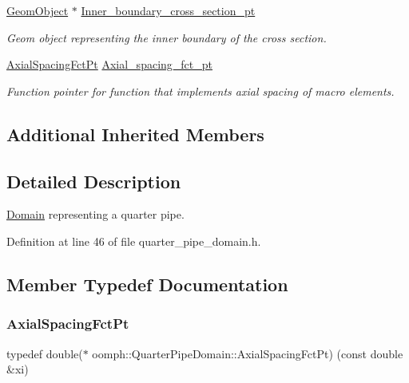 \begin{DoxyCompactItemize}
\hyperlink{classoomph_1_1GeomObject}{Geom\+Object} $\ast$ \hyperlink{classoomph_1_1QuarterPipeDomain_a2760038e136d58a41dcbcd045bd13ae4}{Inner\+\_\+boundary\+\_\+cross\+\_\+section\+\_\+pt}
\begin{DoxyCompactList}\small\item\em Geom object representing the inner boundary of the cross section. \end{DoxyCompactList}\item 
\hyperlink{classoomph_1_1QuarterPipeDomain_a540d441b38146aacb12938d5f885789c}{Axial\+Spacing\+Fct\+Pt} \hyperlink{classoomph_1_1QuarterPipeDomain_ada15e8a576d3715e8ed88ea9bef5508a}{Axial\+\_\+spacing\+\_\+fct\+\_\+pt}
\begin{DoxyCompactList}\small\item\em Function pointer for function that implements axial spacing of macro elements. \end{DoxyCompactList}\end{DoxyCompactItemize}
\subsection*{Additional Inherited Members}


\subsection{Detailed Description}
\hyperlink{classoomph_1_1Domain}{Domain} representing a quarter pipe. 

Definition at line 46 of file quarter\+\_\+pipe\+\_\+domain.\+h.



\subsection{Member Typedef Documentation}
\mbox{\label{classoomph_1_1QuarterPipeDomain_a540d441b38146aacb12938d5f885789c}} 
\subsubsection{\texorpdfstring{Axial\+Spacing\+Fct\+Pt}{AxialSpacingFctPt}}
{\footnotesize\ttfamily typedef double($\ast$ oomph\+::\+Quarter\+Pipe\+Domain\+::\+Axial\+Spacing\+Fct\+Pt) (const double \&xi)}



